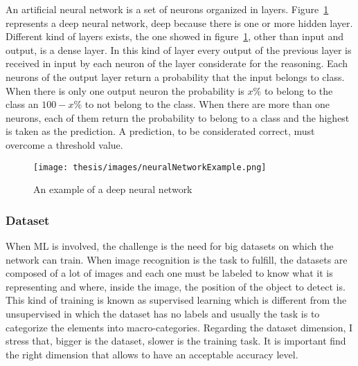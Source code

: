 \documentclass[../thesis.tex]{subfiles}
\begin{document}
An artificial neural network is a set of neurons organized in layers. Figure~\ref{fig:neural_network_example} represents a deep neural network, deep because there is one or more hidden layer. Different kind of layers exists, the one showed in figure~\ref{fig:neural_network_example}, other than input and output, is a dense layer. In this kind of layer every output of the previous layer is received in input by each neuron of the layer considerate for the reasoning. Each neurons of the output layer return a probability that the input belongs to class. When there is only one output neuron the probability is $x\%$ to belong to the class an $100-x\%$ to not belong to the class. When there are more than one neurons, each of them return the probability to belong to a class and the highest is taken as the prediction. A prediction, to be considerated correct, must overcome a threshold value.

\begin{figure}[H]
    \centering
    \texttt{[image: thesis/images/neuralNetworkExample.png]}
    \caption{An example of a deep neural network}
    \label{fig:neural_network_example}
\end{figure}

\subsubsection{Dataset}
When \acrshort{ML} is involved, the challenge is the need for big datasets on which the network can train. When image recognition is the task to fulfill, the datasets are composed of a lot of images and each one must be labeled to know what it is representing and where, inside the image, the position of the object to detect is. This kind of training is known as supervised learning which is different from the unsupervised in which the dataset has no labels and usually the task is to categorize the elements into macro-categories. Regarding the dataset dimension, I stress that, bigger is the dataset, slower is the training task. It is important find the right dimension that allows to have an acceptable accuracy level.
\end{document}
